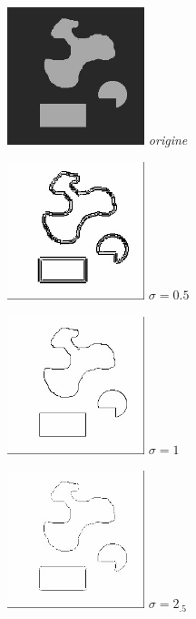 \documentclass[a4,12pt]{article}
\begin{document}
\noindent
\begin{center}
	\begin{minipage}[c]{0.24\linewidth}
		\begin{center}
			\includegraphics[width = 40mm]{./img/1.jpg}
			\textit{origine}
		\end{center}
	\end{minipage}
	\begin{minipage}[c]{0.24\linewidth}
		\begin{center}
			\includegraphics[width = 40mm]{./img/ctrformes1-0_5.jpg}
			\textit{$\sigma = 0.5$}\
		\end{center}
	\end{minipage}
	\begin{minipage}[c]{0.24\linewidth}
		\begin{center}
			\includegraphics[width = 40mm]{./img/ctrformes1-1.jpg}
			\textit{$\sigma = 1$}
		\end{center}
	\end{minipage}
	\begin{minipage}[c]{0.24\linewidth}
		\begin{center}
			\includegraphics[width = 40mm]{./img/ctrformes1-2_5.jpg}
			\textit{$\sigma = 2_.5$}
		\end{center}
	\end{minipage}\\
\end{center}
\end{document}
